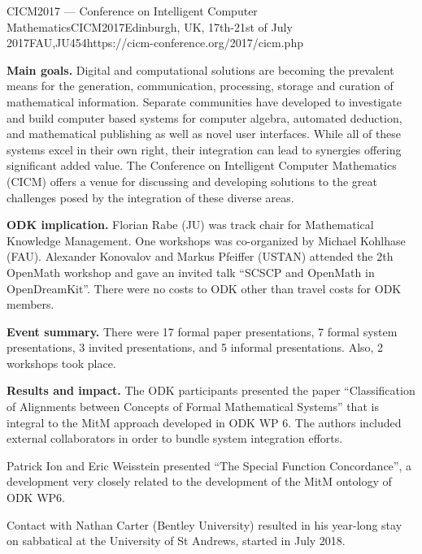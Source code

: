 \begin{event}{CICM2017 --- Conference on Intelligent Computer Mathematics}{CICM2017}{Edinburgh, UK, 17th-21st of July 2017}{FAU,JU}{45}{4}{https://cicm-conference.org/2017/cicm.php}

\textbf{Main goals.}
Digital and computational solutions are becoming the prevalent means for the generation, communication, processing, storage and curation of mathematical information.
Separate communities have developed to investigate and build computer based systems for computer algebra, automated deduction, and mathematical publishing as well as novel user interfaces.
While all of these systems excel in their own right, their integration can lead to synergies offering significant added value.
The Conference on Intelligent Computer Mathematics (CICM) offers a venue for discussing and developing solutions to the great challenges posed by the integration of these diverse areas. 

\textbf{ODK implication.}
Florian Rabe (JU) was track chair for Mathematical Knowledge Management.
One workshops was co-organized by Michael Kohlhase (FAU).
Alexander Konovalov and Markus Pfeiffer (USTAN) attended the 2th OpenMath workshop and gave an invited talk ``SCSCP and OpenMath in OpenDreamKit''.
There were no costs to ODK other than travel costs for ODK members.

\textbf{Event summary.}
There were 17 formal paper presentations, 7 formal system presentations, 3 invited presentations, and 5 informal presentations.
Also, 2 workshops took place.

\textbf{Results and impact.}
The ODK participants presented the paper ``Classification of Alignments between Concepts of Formal Mathematical Systems'' that is integral to the MitM approach developed in ODK WP 6.
The authors included external collaborators in order to bundle system integration efforts.

Patrick Ion and Eric Weisstein presented ``The Special Function Concordance'', a development very closely related to the development of the MitM ontology of ODK WP6.

Contact with Nathan Carter (Bentley University) resulted in his year-long stay on sabbatical at the University of St Andrews, started in July 2018.
\end{event}
